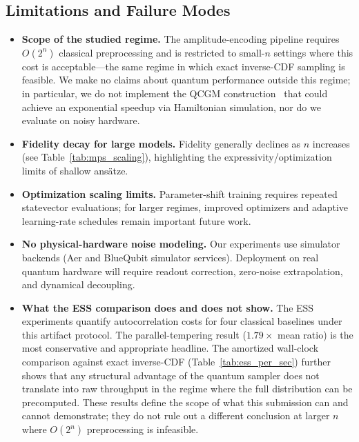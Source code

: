 \documentclass[conference,10pt]{IEEEtran}
\begin{document}
\subsection{Limitations and Failure Modes}\label{sec:limitations_mcmc}
\begin{itemize}[leftmargin=*, topsep=0pt, partopsep=0pt, itemsep=2pt, parsep=0pt]
    \item \textbf{Scope of the studied regime.} The amplitude-encoding pipeline requires $O(2^n)$ classical preprocessing and is restricted to small-$n$ settings where this cost is acceptable---the same regime in which exact inverse-CDF sampling is feasible. We make no claims about quantum performance outside this regime; in particular, we do not implement the QCGM construction~\cite{piatkowski2024qcgms} that could achieve an exponential speedup via Hamiltonian simulation, nor do we evaluate on noisy hardware.
    \item \textbf{Fidelity decay for large models.} Fidelity generally declines as $n$ increases (see Table~\ref{tab:mps_scaling}), highlighting the expressivity/optimization limits of shallow ans\"atze.
    \item \textbf{Optimization scaling limits.} Parameter-shift training requires repeated statevector evaluations; for larger regimes, improved optimizers and adaptive learning-rate schedules remain important future work.
    \item \textbf{No physical-hardware noise modeling.} Our experiments use simulator backends (Aer and BlueQubit simulator services). Deployment on real quantum hardware will require readout correction, zero-noise extrapolation, and dynamical decoupling.
    \item \textbf{What the ESS comparison does and does not show.} The ESS experiments quantify autocorrelation costs for four classical baselines under this artifact protocol. The parallel-tempering result ($1.79\times$ mean ratio) is the most conservative and appropriate headline. The amortized wall-clock comparison against exact inverse-CDF (Table~\ref{tab:ess_per_sec}) further shows that any structural advantage of the quantum sampler does not translate into raw throughput in the regime where the full distribution can be precomputed. These results define the scope of what this submission can and cannot demonstrate; they do not rule out a different conclusion at larger $n$ where $O(2^n)$ preprocessing is infeasible.
\end{itemize}
\end{document}
